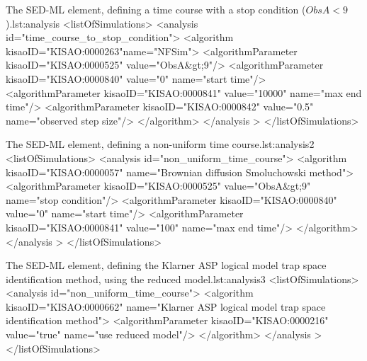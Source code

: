 
\begin{myXmlLst}{The SED-ML  element, defining a time course with a stop condition ($ObsA<9$).}{lst:analysis}
<listOfSimulations>
    <analysis id="time_course_to_stop_condition">
        <algorithm kisaoID="KISAO:0000263"name="NFSim">
            <algorithmParameter kisaoID="KISAO:0000525" value="ObsA&gt;9"/>
            <algorithmParameter kisaoID="KISAO:0000840" value="0" name="start time"/>
            <algorithmParameter kisaoID="KISAO:0000841" value="10000" name="max end time"/>
            <algorithmParameter kisaoID="KISAO:0000842" value="0.5" name="observed step size"/>
        </algorithm>
    </analysis >
</listOfSimulations>
\end{myXmlLst}


\begin{myXmlLst}{The SED-ML  element, defining a non-uniform time course.}{lst:analysis2}
<listOfSimulations>
    <analysis id="non_uniform_time_course">
        <algorithm kisaoID="KISAO:0000057" name="Brownian diffusion Smoluchowski method">
            <algorithmParameter kisaoID="KISAO:0000525" value="ObsA&gt;9" name="stop condition"/>
            <algorithmParameter kisaoID="KISAO:0000840" value="0" name="start time"/>
            <algorithmParameter kisaoID="KISAO:0000841" value="100" name="max end time"/>
        </algorithm>
    </analysis >
</listOfSimulations>
\end{myXmlLst}


\begin{myXmlLst}{The SED-ML  element, defining the Klarner ASP logical model trap space identification method, using the reduced model.}{lst:analysis3}
<listOfSimulations>
    <analysis id="non_uniform_time_course">
        <algorithm kisaoID="KISAO:0000662" name="Klarner ASP logical model trap space identification method">
            <algorithmParameter kisaoID="KISAO:0000216" value="true" name="use reduced model"/>
        </algorithm>
    </analysis >
</listOfSimulations>
\end{myXmlLst}





